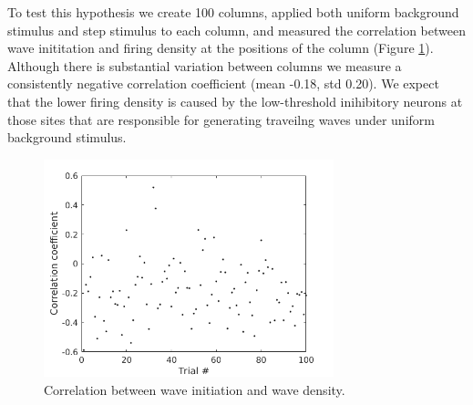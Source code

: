 \documentclass[a4paper,11pt]{article}
\begin{document}
To test this hypothesis we create 100 columns, applied both uniform background stimulus and step stimulus to each column, and measured the correlation between wave inititation and firing density at the positions of the column (Figure \ref{fig:initiation_density_corr}).
Although there is substantial variation between columns we measure a consistently negative correlation coefficient (mean -0.18, std 0.20).
We expect that the lower firing density is caused by the low-threshold inihibitory neurons at those sites that are responsible for generating traveilng waves under uniform background stimulus.
\begin{figure}[!htb]
 \caption{Correlation between wave initiation and wave density.}
 \label{fig:initiation_density_corr}
 \centering
   \includegraphics[width=0.75\textwidth]{fig/InitiationCorrelation}
\end{figure}
\end{document}
